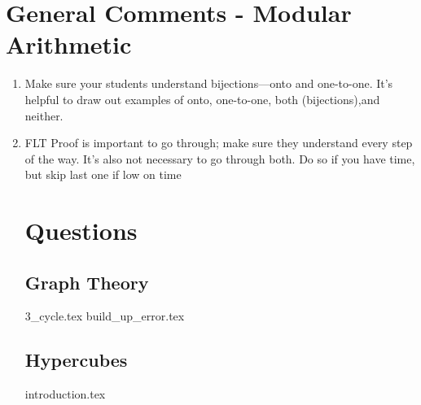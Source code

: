 \documentclass{exam}
\begin{document}
\section{General Comments - Modular Arithmetic}
\begin{enumerate}
\item Make sure your students understand bijections---onto and one-to-one. It's helpful to draw out examples of onto, one-to-one, both (bijections),and neither. 
\item FLT Proof is important to go through; make sure they understand every step of the way. It's also not necessary to go through both. Do so if you have time, but skip last one if low on time
\section{Questions}
\subsection{Graph Theory}
\begin{enumerate}
{3_cycle.tex}
{build_up_error.tex}
\end{enumerate}

\subsection{Hypercubes}
\begin{enumerate}
{introduction.tex}
\end{enumerate}
\end{enumerate}
\end{document}

